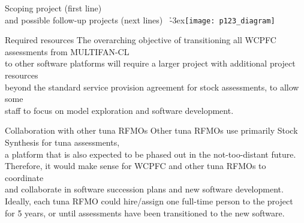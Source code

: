 \documentclass[aspectratio=169,fleqn]{beamer}
\begin{document}

\begin{frame}{Scoping project (first line)\\[0.2ex]
    and possible follow-up projects (next lines)}
  ~\h{-3ex}\texttt{[image: p123\_diagram]}
\end{frame}


\begin{frame}{Required resources}
  The overarching objective of transitioning all WCPFC assessments from
  MULTIFAN-CL\\[0.5ex]
  to other software platforms will require a larger project with
  additional project resources\\[0.5ex]
  beyond the standard service provision agreement for stock assessments, to
  allow some\\[0.5ex]
  staff to focus on model exploration and software development.
\end{frame}


\begin{frame}{Collaboration with other tuna RFMOs}
  Other tuna RFMOs use primarily Stock Synthesis for tuna assessments,\\[0.5ex]
  a platform that is also expected to be phased out in the not-too-distant
  future.\\[0.5ex]
  Therefore, it would make sense for WCPFC and other tuna RFMOs to
  coordinate\\[0.5ex]
  and collaborate in software succession plans and new software
  development.\\[5ex]
  Ideally, each tuna RFMO could hire/assign one full-time person to the
  project\\[0.5ex]
  for 5 years, or until assessments have been transitioned to the new
  software.\\[4ex]
\end{frame}

\end{document}
